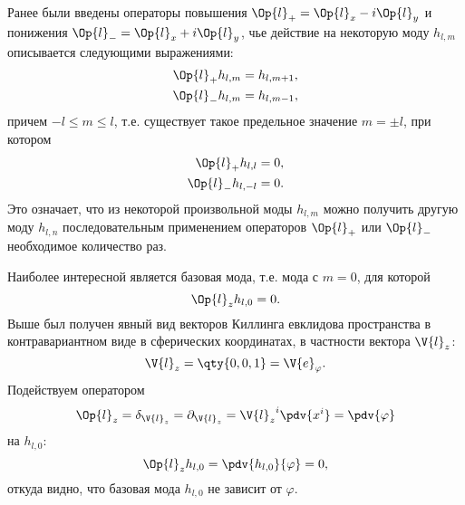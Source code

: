     Ранее были введены операторы повышения $\Op{l}_{+} = \Op{l}_x - i \Op{l}_y$ и понижения $\Op{l}_{-} = \Op{l}_x + i \Op{l}_y$, чье действие на некоторую моду $h_{l, m}$ описывается следующими выражениями:
    \begin{equation}\begin{aligned}
        \Op{l}_{+} h_{l, m} &= h_{l, m+1} , \\
        \Op{l}_{-} h_{l, m} &= h_{l, m-1} ,
    \end{aligned}\end{equation}
    причем $- l \le m \le l$, т.е. существует такое предельное значение $m = \pm l$, при котором
    \begin{equation}\begin{aligned}
        \Op{l}_{+} h_{l, l}   &= 0 , \\
        \Op{l}_{-} h_{l, - l} &= 0 .
    \end{aligned}\end{equation}
    Это означает, что из некоторой произвольной моды $h_{l, m}$ можно получить другую моду $h_{l, n}$ последовательным применением операторов $\Op{l}_{+}$ или $\Op{l}_{-}$ необходимое количество раз.

    Наиболее интересной является базовая мода, т.е. мода с $m = 0$, для которой
    \begin{equation}
        \Op{l}_z h_{l, 0} = 0 .
    \end{equation}
    Выше был получен явный вид векторов Киллинга евклидова пространства в контравариантном виде в сферических координатах, в частности вектора $\V{l}_z$:
    \begin{equation}
        \V{l}_z = \qty{ 0, 0, 1 } = \V{e}_\varphi .
    \end{equation}
    Подействуем оператором\footnotemark
    \begin{equation}
        \Op{l}_z
            = \delta_{\V{l}_z}
            = \partial_{\V{l}_z}
            = {\V{l}_z}^i \pdv{x^i}
            = \pdv{\varphi}
    \end{equation}
    на $h_{l, 0}$:
    \begin{equation}
        \Op{l}_z h_{l, 0} = \pdv{h_{l, 0}}{\varphi} = 0 ,
    \end{equation}
    откуда видно, что базовая мода $h_{l, 0}$ не зависит от $\varphi$.


